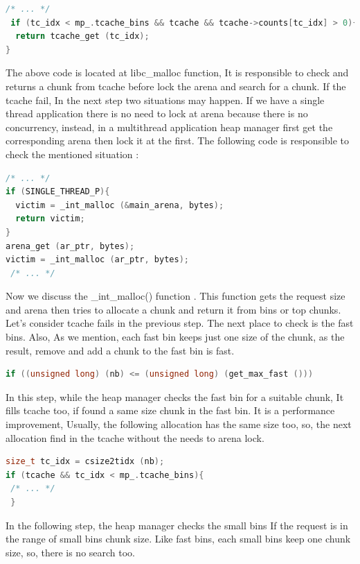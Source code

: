 \documentclass{masterthesis}
\newcommand*\tch{tcache}
\newcommand*\fb{fast bins}
\newcommand*\sbs{small bins}
\begin{document}
\begin{lstlisting}[language=c,frame=tlrb]
 /* ... */ 
 if (tc_idx < mp_.tcache_bins && tcache && tcache->counts[tc_idx] > 0){
  return tcache_get (tc_idx);
}
\end{lstlisting}

The above code is located at libc\_malloc function, It is responsible to check and returns a chunk from \tch{} before lock the arena and search for a chunk. If the \tch{} fail, In the next step two situations may happen. If we have a single thread application there is no need to lock at arena because there is no concurrency, instead, in a multi\-thread application heap manager first get the corresponding arena then lock it at the first. The following code is responsible to check the mentioned situation :

\begin{lstlisting}[language=c,frame=tlrb]
 /* ... */ 
if (SINGLE_THREAD_P){
  victim = _int_malloc (&main_arena, bytes);
  return victim;
}
arena_get (ar_ptr, bytes);
victim = _int_malloc (ar_ptr, bytes);
 /* ... */ 
\end{lstlisting}

Now we discuss the \_int\_malloc() function . This function gets the request size and arena then tries to allocate a chunk and return it from bins or top chunks. Let's consider \tch{} fails in the previous step. The next place to check is the \fb{}. Also, As we mention, each fast bin keeps just one size of the chunk, as the result, remove and add a chunk to the fast bin is fast.

\begin{lstlisting}[language=c,frame=tlrb]
if ((unsigned long) (nb) <= (unsigned long) (get_max_fast ()))
\end{lstlisting}

In this step, while the heap manager checks the fast bin for a suitable chunk, It fills \tch{} too, if found a same size chunk in the fast bin. It is a performance improvement, Usually, the following allocation has the same size too, so, the next allocation find in the \tch{} without the needs to arena lock.

\begin{lstlisting}[language=c,frame=tlrb]
size_t tc_idx = csize2tidx (nb);
if (tcache && tc_idx < mp_.tcache_bins){
 /* ... */ 
 }
\end{lstlisting}

In the following step, the heap manager checks the \sbs{} If the request is in the range of \sbs{} chunk size. Like \fb{}, each \sbs{} keep one chunk size, so, there is no search too.
\end{document}
